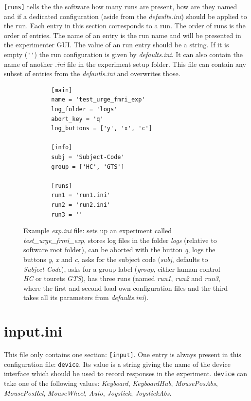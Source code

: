 \documentclass[12pt,a4paper]{book}
\begin{document}
\verb|[runs]| tells the the software how many runs are present, how are they named and if a dedicated configuration (aside from the \textit{defaults.ini}) should be applied to the run. Each entry in this section corresponds to a run. The order of runs is the order of entries. The name of an entry is the run name and will be presented in the experimenter GUI. The value of an run entry should be a string. If it is empty (\verb|''|) the run configuration is given by \textit{defaults.ini}. It can also contain the name of another \textit{.ini} file in the experiment setup folder. This file can contain any subset of entries from the \textit{defautls.ini} and overwrites those.

\begin{figure}
	\begin{framed}
		\begin{verbatim}
		[main]
		name = 'test_urge_fmri_exp'
		log_folder = 'logs'
		abort_key = 'q'
		log_buttons = ['y', 'x', 'c']
		
		[info]
		subj = 'Subject-Code'
		group = ['HC', 'GTS']
		
		[runs]
		run1 = 'run1.ini'
		run2 = 'run2.ini'
		run3 = ''
		\end{verbatim}
	\end{framed}
	
	\caption{Example \textit{exp.ini} file: sets up an experiment called \textit{test\_urge\_frmi\_exp}, stores log files in the folder \textit{logs} (relative to software root folder), can be aborted with the button \textit{q}, logs the buttons \textit{y}, \textit{x} and \textit{c}, asks for the subject code (\textit{subj}, defaults to \textit{Subject-Code}), asks for a group label (\textit{group}, either human control \textit{HC} or tourets \textit{GTS}), has three runs (named \textit{run1}, \textit{run2} and \textit{run3}, where the first and second load own configuration files and the third takes all its parameters from \textit{defaults.ini}). }
	\label{fig:expini}
\end{figure}

\section{input.ini}

This file only contains one section: \verb|[input]|. One entry is always present in this configuration file: \verb|device|. Its value is a string giving the name of the device interface which should be used to record responses in the experiment. \verb|device| can take one of the following values: \textit{Keyboard}, \textit{KeyboardHub}, \textit{MousePosAbs}, \textit{MousePosRel}, \textit{MouseWheel}, \textit{Auto}, \textit{Joystick}, \textit{JoystickAbs}.
\end{document}
